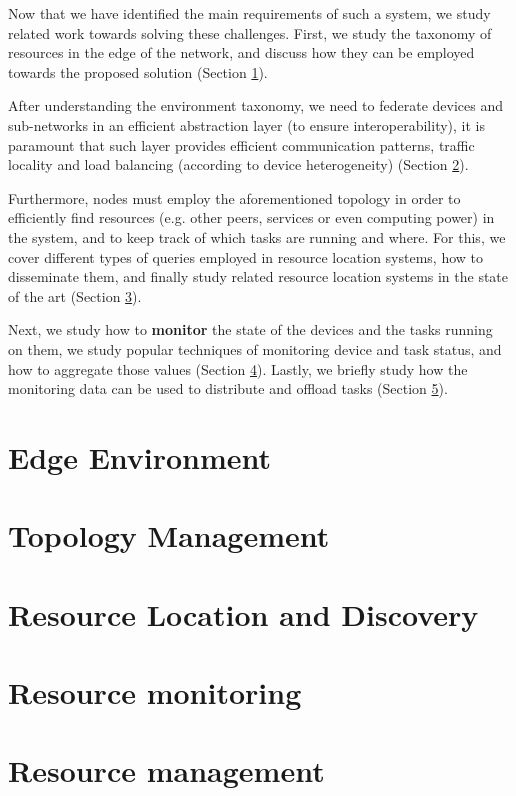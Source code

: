 Now that we have identified the main requirements of such a system, we study related work towards solving these challenges. First, we study the taxonomy of resources in the edge of the network, and discuss how they can be employed towards the proposed solution (Section \ref{sec:edge_computing}).

After understanding the environment taxonomy, we need to federate devices and sub-networks in an efficient abstraction layer (to ensure interoperability), it is paramount that such layer provides efficient communication patterns, traffic locality and load balancing (according to device heterogeneity) (Section \ref{sec:topology_management}).

Furthermore, nodes must employ the aforementioned topology in order to efficiently find resources (e.g. other peers, services or even computing power) in the system, and to keep track of which tasks are running and where. For this, we cover different types of queries employed in resource location systems, how to disseminate them, and finally study related resource location systems in the state of the art (Section \ref{sec:res_location}).

Next, we study how to \textbf{monitor} the state of the devices and the tasks running on them, we study popular techniques of monitoring device and task status, and how to aggregate those values (Section \ref{sec:res_monitoring}). Lastly, we briefly study how the monitoring data can be used to distribute and offload tasks (Section \ref{sec:res_management}). 

\section{Edge Environment} \label{sec:edge_computing} 

\section{Topology Management} \label{sec:topology_management} 

\section{Resource Location and Discovery} \label{sec:res_location} 

\section{Resource monitoring} \label{sec:res_monitoring} 

\section{Resource management} \label{sec:res_management} 


